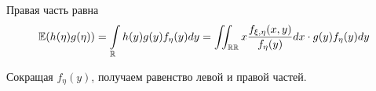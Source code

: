         Правая часть равна
        \begin{equation*}
            \operatorname{\mathbb{E}} (h(\eta) g(\eta))=\int\limits_{\mathbb{R}} h(y) g(y) f_{\eta}(y) dy=\iint_{\mathbb{R} \mathbb{R}} x \frac{f_{\xi, \eta}(x, y)}{f_{\eta}(y)} dx \cdot g(y) f_{\eta}(y) dy
        \end{equation*}
        
        Сокращая $f_{\eta}(y)$, получаем равенство левой и правой частей.
\fi
